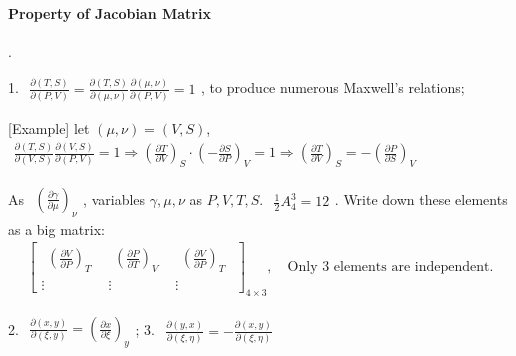 \documentclass[../../main.tex]{subfiles}
\begin{document}
\paragraph{Property of Jacobian Matrix}.

1. $\begin{aligned}
    \frac{\partial (T,S)}{\partial (P,V)} = \frac{\partial (T,S)}{\partial (\mu,\nu)}\frac{\partial (\mu,\nu)}{\partial (P,V)} = 1
\end{aligned}$, to produce numerous Maxwell's relations; 

[Example] let $(\mu,\nu) = (V,S)$, $\begin{aligned}
    \frac{\partial (T,S)}{\partial (V,S)}\frac{\partial (V,S)}{\partial (P,V)} = 1\Rightarrow \left(\frac{\partial T}{\partial V}\right)_{S} \cdot\left(-\frac{\partial S}{\partial P}\right)_{V} = 1\Rightarrow \left(\frac{\partial T}{\partial V}\right)_{S} = -\left(\frac{\partial P}{\partial S}\right)_{V}
\end{aligned}$

As $\begin{aligned}
    \left(\frac{\partial\gamma}{\partial\mu}\right)_{\nu}
\end{aligned}$, variables $\gamma,\mu,\nu$ as $P,V,T,S$. $\begin{aligned}
    \frac{1}{2}A_{4}^{3} = 12
\end{aligned}$. Write down these elements as a big matrix:
\begin{align*}
    \begin{bmatrix}
        \begin{aligned}
            \left(\frac{\partial V}{\partial P}\right)_{T}
        \end{aligned} & 
        \begin{aligned}
            \left(\frac{\partial P}{\partial T}\right)_{V}
        \end{aligned} & 
        \begin{aligned}
            \left(\frac{\partial V}{\partial P}\right)_{T}
        \end{aligned} \\
        \vdots & \vdots & \vdots
    \end{bmatrix}_{4\times 3},\quad \text{Only 3 elements are independent}.
\end{align*}

    
2. $\begin{aligned}
        \frac{\partial (x,y)}{\partial (\xi, y)} =\left(\frac{\partial x}{\partial\xi}\right)_{y}
    \end{aligned}$; 
3. $\begin{aligned}
        \frac{\partial (y,x)}{\partial(\xi,\eta)} = -\frac{\partial (x,y)}{\partial(\xi,\eta)}
    \end{aligned}$
\end{document}
